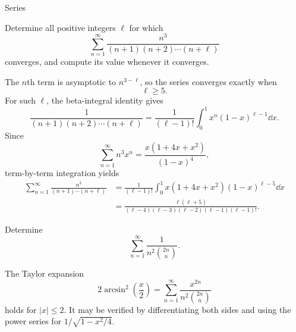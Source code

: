 \begin{expectedproblemgroup}{Series}
        \begin{expectedsubproblem}
            Determine all positive integers $\ell$ for which
            \[
                \sum_{n=1}^{\infty}
                \frac{n^3}{(n+1)(n+2)\cdots(n+\ell)}
            \]
            converges, and compute its value whenever it converges.
        \end{expectedsubproblem}

        \begin{expectedsubsolution}
            The $n$th term is asymptotic to $n^{3-\ell}$, so the series converges
            exactly when
            \[
                \ell\geq5.
            \]
            For such $\ell$, the beta-integral identity gives
            \[
                \frac{1}{(n+1)(n+2)\cdots(n+\ell)}
                =
                \frac{1}{(\ell-1)!}
                \int_0^1x^n(1-x)^{\ell-1}\dd x.
            \]
            Since
            \[
                \sum_{n=1}^{\infty}n^3x^n
                =
                \frac{x(1+4x+x^2)}{(1-x)^4},
            \]
            term-by-term integration yields
            \[
                \begin{aligned}
                    \sum_{n=1}^{\infty}
                    \frac{n^3}{(n+1)\cdots(n+\ell)}
                    &=
                    \frac{1}{(\ell-1)!}
                    \int_0^1x(1+4x+x^2)(1-x)^{\ell-5}\dd x\\
                    &=
                    \boxed{
                        \frac{\ell(\ell+5)}{
                            (\ell-4)(\ell-3)(\ell-2)(\ell-1)(\ell-1)!
                        }
                    }.
                \end{aligned}
            \]
        \end{expectedsubsolution}

        \begin{expectedsubproblem}
            Determine
            \[
                \sum_{n=1}^{\infty}
                \frac{1}{n^2\binom{2n}{n}}.
            \]
        \end{expectedsubproblem}

        \begin{expectedsubsolution}
            The Taylor expansion
            \[
                2\arcsin^2\left(\frac{x}{2}\right)
                =
                \sum_{n=1}^{\infty}
                \frac{x^{2n}}{n^2\binom{2n}{n}}
            \]
            holds for $|x|\leq2$. It may be verified by differentiating both sides
            and using the power series for $1/\sqrt{1-x^2/4}$.


\end{expectedsubsolution}
\end{expectedproblemgroup}
